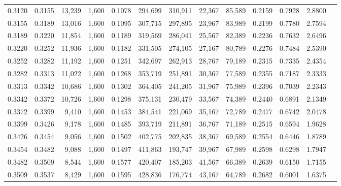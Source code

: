 \begin{tabular}{rrrrrrrrrrrrr}
0.3120 & 0.3155 & 13,239 & 1,600 &                                     0.1078 & 294,699 & 310,911 &  22,367 &  85,589 & 0.2159 & 0.7928 & 2.8800 \\
0.3155 & 0.3189 & 13,016 & 1,600 &                                     0.1095 & 307,715 & 297,895 &  23,967 &  83,989 & 0.2199 & 0.7780 & 2.7594 \\
0.3189 & 0.3220 & 11,854 & 1,600 &                                     0.1189 & 319,569 & 286,041 &  25,567 &  82,389 & 0.2236 & 0.7632 & 2.6496 \\
0.3220 & 0.3252 & 11,936 & 1,600 &                                     0.1182 & 331,505 & 274,105 &  27,167 &  80,789 & 0.2276 & 0.7484 & 2.5390 \\
0.3252 & 0.3282 & 11,192 & 1,600 &                                     0.1251 & 342,697 & 262,913 &  28,767 &  79,189 & 0.2315 & 0.7335 & 2.4354 \\
0.3282 & 0.3313 & 11,022 & 1,600 &                                     0.1268 & 353,719 & 251,891 &  30,367 &  77,589 & 0.2355 & 0.7187 & 2.3333 \\
0.3313 & 0.3342 & 10,686 & 1,600 &                                     0.1302 & 364,405 & 241,205 &  31,967 &  75,989 & 0.2396 & 0.7039 & 2.2343 \\
0.3342 & 0.3372 & 10,726 & 1,600 &                                     0.1298 & 375,131 & 230,479 &  33,567 &  74,389 & 0.2440 & 0.6891 & 2.1349 \\
0.3372 & 0.3399 &  9,410 & 1,600 &                                     0.1453 & 384,541 & 221,069 &  35,167 &  72,789 & 0.2477 & 0.6742 & 2.0478 \\
0.3399 & 0.3426 &  9,178 & 1,600 &                                     0.1485 & 393,719 & 211,891 &  36,767 &  71,189 & 0.2515 & 0.6594 & 1.9628 \\
0.3426 & 0.3454 &  9,056 & 1,600 &                                     0.1502 & 402,775 & 202,835 &  38,367 &  69,589 & 0.2554 & 0.6446 & 1.8789 \\
0.3454 & 0.3482 &  9,088 & 1,600 &                                     0.1497 & 411,863 & 193,747 &  39,967 &  67,989 & 0.2598 & 0.6298 & 1.7947 \\
0.3482 & 0.3509 &  8,544 & 1,600 &                                     0.1577 & 420,407 & 185,203 &  41,567 &  66,389 & 0.2639 & 0.6150 & 1.7155 \\
0.3509 & 0.3537 &  8,429 & 1,600 &                                     0.1595 & 428,836 & 176,774 &  43,167 &  64,789 & 0.2682 & 0.6001 & 1.6375 \\

\end{tabular}
